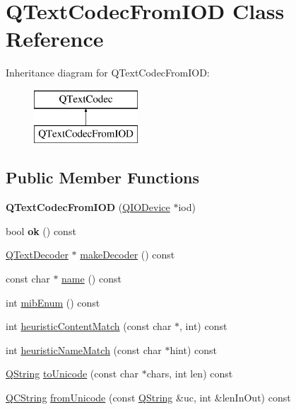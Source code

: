 \hypertarget{class_q_text_codec_from_i_o_d}{}\section{Q\+Text\+Codec\+From\+I\+OD Class Reference}
\label{class_q_text_codec_from_i_o_d}
Inheritance diagram for Q\+Text\+Codec\+From\+I\+OD\+:\begin{figure}[H]
\begin{center}
\leavevmode
\includegraphics[height=2.000000cm]{class_q_text_codec_from_i_o_d}
\end{center}
\end{figure}
\subsection*{Public Member Functions}
\begin{DoxyCompactItemize}
\item 
\mbox{\label{class_q_text_codec_from_i_o_d_a385183a568f0cf30c2296766e55dcfc9}} 
{\bfseries Q\+Text\+Codec\+From\+I\+OD} (\mbox{\hyperlink{class_q_i_o_device}{Q\+I\+O\+Device}} $\ast$iod)
\item 
\mbox{\label{class_q_text_codec_from_i_o_d_adf27d26264ff1afae80fe3e047a5d9a8}} 
bool {\bfseries ok} () const
\item 
\mbox{\hyperlink{class_q_text_decoder}{Q\+Text\+Decoder}} $\ast$ \mbox{\hyperlink{class_q_text_codec_from_i_o_d_ae5184561209ee0771ad28d3888a2a89c}{make\+Decoder}} () const
\item 
const char $\ast$ \mbox{\hyperlink{class_q_text_codec_from_i_o_d_ac80023588673bad8a8b0d6983832c884}{name}} () const
\item 
int \mbox{\hyperlink{class_q_text_codec_from_i_o_d_aa2a1123c86835c8395a058082c9fbdd3}{mib\+Enum}} () const
\item 
int \mbox{\hyperlink{class_q_text_codec_from_i_o_d_a5a3016db9b6c0f2ad76bbf74ce60a053}{heuristic\+Content\+Match}} (const char $\ast$, int) const
\item 
int \mbox{\hyperlink{class_q_text_codec_from_i_o_d_af7109ff23e3f6c34228eb046578c0357}{heuristic\+Name\+Match}} (const char $\ast$hint) const
\item 
\mbox{\hyperlink{class_q_string}{Q\+String}} \mbox{\hyperlink{class_q_text_codec_from_i_o_d_af43c97a602cfb4e7d8d74d7a93925f48}{to\+Unicode}} (const char $\ast$chars, int len) const
\item 
\mbox{\hyperlink{class_q_c_string}{Q\+C\+String}} \mbox{\hyperlink{class_q_text_codec_from_i_o_d_af5b4ad5ff7fbe98683b7bd7d54cd40c0}{from\+Unicode}} (const \mbox{\hyperlink{class_q_string}{Q\+String}} \&uc, int \&len\+In\+Out) const
\end{DoxyCompactItemize}

